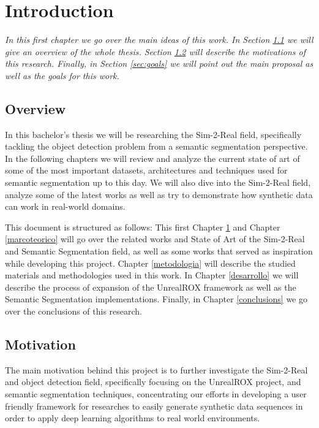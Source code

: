 
\chapter{Introduction}
\label{introduction}
\textit{In this first chapter we go over the main ideas of this work. In Section \ref{sec:overview} we will give an overview of the whole thesis. Section \ref{sec:motivation} will describe the motivations of this research. Finally, in Section \ref{sec:goals} we will point out the main proposal as well as the goals for this work.}

\section{Overview}
\label{sec:overview}
In this bachelor's thesis we will be researching the Sim-2-Real field, specifically tackling the object detection problem from a semantic segmentation perspective. In the following chapters we will review and analyze the current state of art of some of the most important datasets, architectures and techniques used for semantic segmentation up to this day. We will also dive into the Sim-2-Real field, analyze some of the latest works as well as try to demonstrate how synthetic data can work in real-world domains.

This document is structured as follows: This first Chapter \ref{introduction} and Chapter \ref{marcoteorico} will go over the related works and State of Art of the Sim-2-Real and Semantic Segmentation field, as well as some works that served as inspiration while developing this project. Chapter \ref{metodologia} will describe the studied materials and methodologies used in this work. In Chapter \ref{desarrollo} we will describe the process of expansion of the UnrealROX framework as well as the Semantic Segmentation implementations. Finally, in Chapter \ref{conclusions} we go over the conclusions of this research.

\section{Motivation}
\label{sec:motivation}
The main motivation behind this project is to further investigate the Sim-2-Real and object detection field, specifically focusing on the UnrealROX project, and semantic segmentation techniques, concentrating our efforts in developing a user friendly framework for researches to easily generate synthetic data sequences in order to apply deep learning algorithms to real world environments.

